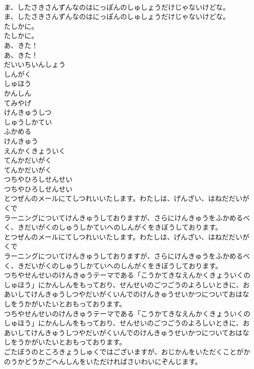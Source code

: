 \documentclass[8pt]{extreport}
\begin{document}
\begin{CJK}{UTF8}{min}
\\	ま、したさきさんずんなのはにっぽんのしゅしょうだけじゃないけどな。
\\	ま、したさきさんずんなのはにっぽんのしゅしょうだけじゃないけどな。
\\	たしかに。
\\	たしかに。
\\	あ、きた！
\\	あ、きた！
\\	だいいちいんしょう
\\	しんがく
\\	しゅほう
\\	かんしん
\\	てみやげ
\\	けんきゅうしつ
\\	しゅうしかてい
\\	ふかめる
\\	けんきゅう
\\	えんかくきょういく
\\	てんかだいがく
\\	てんかだいがく
\\	つちやひろしせんせい
\\	つちやひろしせんせい
\\	とつぜんのメールにてしつれいいたします。わたしは、げんざい、はねだだいがくで
\\	ラーニングについてけんきゅうしておりますが、さらにけんきゅうをふかめるべく、きだいがくのしゅうしかていへのしんがくをきぼうしております。
\\	とつぜんのメールにてしつれいいたします。わたしは、げんざい、はねだだいがくで
\\	ラーニングについてけんきゅうしておりますが、さらにけんきゅうをふかめるべく、きだいがくのしゅうしかていへのしんがくをきぼうしております。
\\	つちやせんせいのけんきゅうテーマである「こうかてきなえんかくきょういくのしゅほう」にかんしんをもっており、せんせいのごつごうのよろしいときに、おあいしてけんきゅうしつやだいがくいんでのけんきゅうせいかつについておはなしをうかがいたいとおもっております。
\\	つちやせんせいのけんきゅうテーマである「こうかてきなえんかくきょういくのしゅほう」にかんしんをもっており、せんせいのごつごうのよろしいときに、おあいしてけんきゅうしつやだいがくいんでのけんきゅうせいかつについておはなしをうかがいたいとおもっております。
\\	ごたぼうのところきょうしゅくではございますが、おじかんをいただくことがかのうかどうかごへんしんをいただければさいわいにぞんじます。

\end{CJK}
\end{document}
